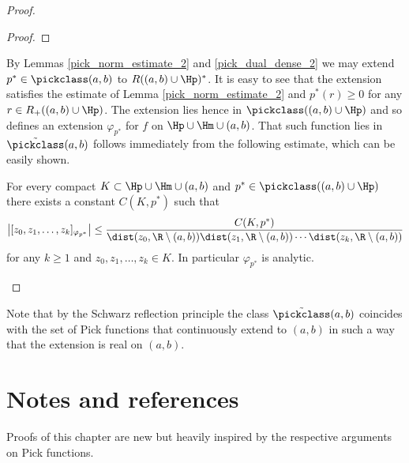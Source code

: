 \begin{proof}
\begin{proof}
	\end{proof}
	By Lemmas \ref{pick_norm_estimate_2} and \ref{pick_dual_dense_2} we may extend $p^{*} \in \pickclass(a, b)$ to $R((a, b) \cup \Hp)^{*}$. It is easy to see that the extension satisfies the estimate of Lemma \ref{pick_norm_estimate_2} and $p^{*}(r) \geq 0$ for any $r \in R_{+}((a, b) \cup \Hp)$. The extension lies hence in $\pickclass((a, b) \cup \Hp)$ and so defines an extension $\varphi_{p^{*}}$ for $f$ on $\Hp \cup \Hm \cup (a, b)$. That such function lies in $\tilde{\pickclass}(a, b)$ follows immediately from the following estimate, which can be easily shown.
	\begin{lem}\label{pick_div_dif_estimate_2}
		For every compact $K \subset \Hp \cup \Hm \cup (a, b)$ and $p^{*} \in \pickclass((a, b) \cup \Hp)$ there exists a constant $C(K, p^{*})$ such that
		\begin{align*}
			\left|[z_{0}, z_{1}, \ldots, z_{k}]_{\varphi_{p^{*}}}\right| \leq \frac{C(K, p^{*})}{\dist(z_{0}, \R \setminus (a, b)) \dist(z_{1}, \R \setminus (a, b)) \cdots \dist(z_{k}, \R \setminus (a, b))}
		\end{align*}
		for any $k \geq 1$ and $z_{0}, z_{1}, \ldots, z_{k} \in K$. In particular $\varphi_{p^{*}}$ is analytic.
	\end{lem}
\end{proof}

Note that by the Schwarz reflection principle the class $\tilde{\pickclass}(a, b)$ coincides with the set of Pick functions that continuously extend to $(a, b)$ in such a way that the extension is real on $(a, b)$.

\section{Notes and references}

Proofs of this chapter are new but heavily inspired by the respective arguments on Pick functions.

